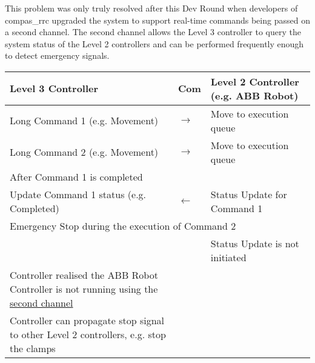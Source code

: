 This problem was only truly resolved after this Dev Round when developers of compas\_rrc upgraded the system to support real-time commands being passed on a second channel. The second channel allows the Level 3 controller to query the system status of the Level 2 controllers and can be performed frequently enough to detect emergency signals.

\begin{table}[H]
\begin{adjustbox}{max width=\textwidth}
\begin{tabular}{p{7.04cm}p{1.67cm}p{7.17cm}}
\hline
\multicolumn{1}{|p{7.04cm}}{{\footnotesize \textbf{Level 3 Controller}}} & 
\multicolumn{1}{|p{1.67cm}}{{\footnotesize \textbf{Com}}} & 
\multicolumn{1}{|p{7.17cm}|}{{\footnotesize \textbf{Level 2 Controller (e.g. ABB Robot)}}} \\ 
\hline
\multicolumn{1}{|p{7.04cm}}{{\footnotesize Long Command 1 (e.g. Movement)}} & 
\multicolumn{1}{|p{1.67cm}}{\centering
{\footnotesize $\rightarrow$}} & 
\multicolumn{1}{|p{7.17cm}|}{{\footnotesize Move to execution queue}} \\ 
\hline
\multicolumn{1}{|p{7.04cm}}{{\footnotesize Long Command 2 (e.g. Movement)}} & 
\multicolumn{1}{|p{1.67cm}}{\centering
{\footnotesize $\rightarrow$}} & 
\multicolumn{1}{|p{7.17cm}|}{{\footnotesize Move to execution queue}} \\ 
\hline
\multicolumn{3}{|p{15.87cm}|}{{\footnotesize After Command 1 is completed}} \\ 
\hline
\multicolumn{1}{|p{7.04cm}}{{\footnotesize Update Command 1 status (e.g. Completed)}} & 
\multicolumn{1}{|p{1.67cm}}{\centering
{\footnotesize $\leftarrow$}} & 
\multicolumn{1}{|p{7.17cm}|}{{\footnotesize Status Update for Command 1}} \\ 
\hline
\multicolumn{3}{|p{15.87cm}|}{{\footnotesize Emergency Stop during the execution of Command 2}} \\ 
\hline
\multicolumn{1}{|p{7.04cm}}{} & 
\multicolumn{1}{|p{1.67cm}}{} & 
\multicolumn{1}{|p{7.17cm}|}{{\footnotesize Status Update is not initiated}} \\ 
\hline
\multicolumn{1}{|p{7.04cm}}{{\footnotesize Controller realised the ABB Robot Controller is not running using the \uline{second channel}}} & 
\multicolumn{1}{|p{1.67cm}}{} & 
\multicolumn{1}{|p{7.17cm}|}{} \\ 
\hline
\multicolumn{1}{|p{7.04cm}}{{\footnotesize Controller can propagate stop signal to other Level 2 controllers, e.g. stop the clamps}} & 
\multicolumn{1}{|p{1.67cm}}{} & 
\multicolumn{1}{|p{7.17cm}|}{} \\ 
\hline
\end{tabular}
\end{adjustbox}
\end{table}
\vspace{7\baselineskip}

